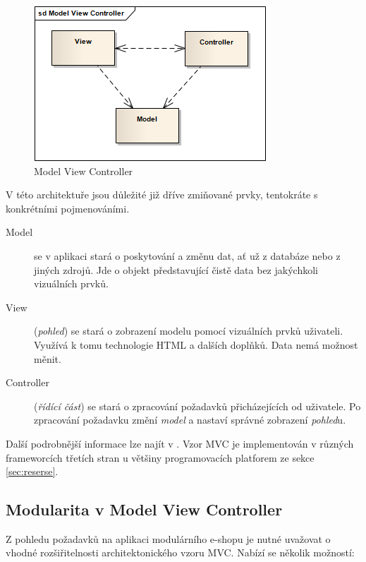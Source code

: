 \documentclass[11pt,twoside,a4paper]{book}
\begin{document}
\begin{figure}[h!]
\begin{center}
\includegraphics[scale=0.75]{figures/mvc}
\caption{Model View Controller}
\label{fig:mvc}
\end{center}
\end{figure}

V této architektuře jsou důležité již dříve zmiňované prvky, tentokráte s konkrétními pojmenováními.

\begin{description}
\item[Model] se v aplikaci stará o poskytování a změnu dat, ať už z databáze nebo z jiných zdrojů. Jde o objekt představující čistě data bez jakýchkoli vizuálních prvků.
\item[View] (\textit{pohled}) se stará o zobrazení modelu pomocí vizuálních prvků uživateli. Využívá k tomu technologie HTML a dalších doplňků. Data nemá možnost měnit.
\item[Controller] (\textit{řídící část}) se stará o zpracování požadavků přicházejících od uživatele. Po zpracování požadavku změní \textit{model} a nastaví správné zobrazení \textit{pohled}u.
\end{description}

Další podrobnější informace lze najít v \citep{PEAA}. Vzor MVC je implementován v různých frameworcích třetích stran u většiny programovacích platforem ze sekce \ref{sec:reserse}.

\subsection{Modularita v Model View Controller}

Z pohledu požadavků na aplikaci modulárního e-shopu je nutné uvažovat o vhodné rozšiřitelnosti architektonického vzoru MVC. Nabízí se několik možností:
\end{document}
